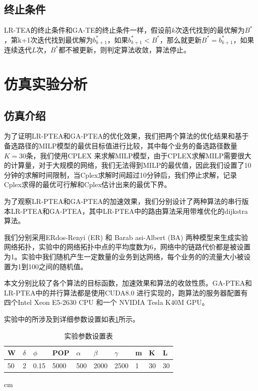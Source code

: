 \subsection{终止条件}
LR-TEA的终止条件和GA-TE的终止条件一样，假设前$k$次迭代找到的最优解为$B^*$，第k+1次迭代找到最优解为$b_{k+1}^*$，如果$b_{k+1}^*<B^*$，那么就更新$B^*=b_{k+1}^*$，如果连续迭代$L$次，$B^*$都不被更新，则判定算法收敛，算法停止。
\section{仿真实验分析}

\subsection {仿真介绍}

为了证明LR-PTEA和GA-PTEA的优化效果，我们把两个算法的优化结果和基于备选路径的MILP模型的最优目标值进行比较，其中每个业务的备选路径数量$K=30$条，我们使用CPLEX 来求解MILP模型，由于CPLEX求解MILP需要很大的计算量，对于大规模的网络，我们无法得到MILP的最优值，因此我们设置了10分钟的求解时间限制，当Cplex求解时间超过10分钟后，我们停止求解，记录Cplex求得的最优可行解和Cplex估计出来的最优下界。

为了观察LR-PTEA和GA-PTEA的加速效果，我们分别设计了两种算法的串行版本LR-PTEA和GA-PTEA，其中LR-PTEA中的路由算法采用带堆优化的dijkstra算法。

我们分别采用ERdos-Renyi (ER) 和 Barab asi-Albert (BA) 两种模型来生成实验网络拓扑，实验中的网络拓扑中点的平均度数为6，网络中的链路代价都是被设置为1。实验中我们随机产生一定数量的业务到达网络，每个业务的的流量大小被设置为1到100之间的随机值。

本文分别比较了各个算法的目标函数，加速效果和算法的收敛性质。GA-PTEA和LR-PTEA中的并行算法都是使用CUDA8.0 进行实现的，跑算法的服务器配置有四个Intel Xeon E5-2630 CPU 和一个 NVIDIA Tesla K40M GPU。

实验中的所涉及到详细参数设置如表\ref{paramter}所示。

\begin{table}[t]
\newcommand{\tabincell}[2]{\begin{tabular}{@{}#1@{}}#2\end{tabular}}
\centering
\scriptsize{
\renewcommand{\tabcolsep}{0.09cm}
\renewcommand{\arraystretch}{1.2}
\caption{实验参数设置表}
\begin{tabular}{| p{1.2cm} | p{1.2cm} | p{1.2cm} | p{1.2cm} | p{1.2cm} | p{1.2cm} | p{1.2cm} | p{1.2cm} | p{1.2cm} | p{1.2cm} |}
\hline
W&$\delta$&$\phi$&POP&$\alpha$&$\beta$&$\gamma$&m&K&L\\ \hline
50&2&0.15&5000&500&2000&2500&1&30&30\\ \hline
\end{tabular}
 cm
\label{paramter}
}
\end{table}

